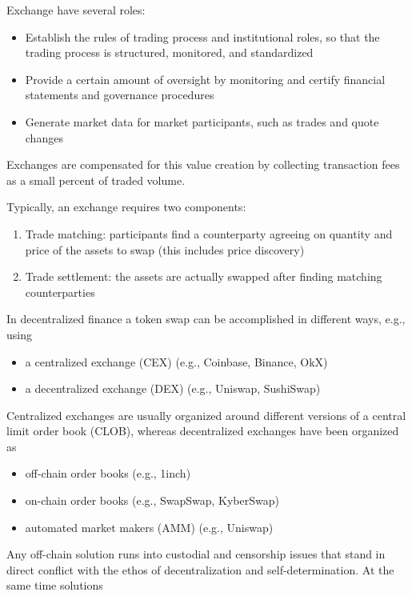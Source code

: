 \documentclass[11pt, reqno]{amsart}
\theoremstyle{definition}
\theoremstyle{remark}
\begin{document}
Exchange have several roles:
\begin{itemize}
\item Establish the rules of trading process and institutional roles, so that
  the trading process is structured, monitored, and standardized
\item Provide a certain amount of oversight by monitoring and certify financial
  statements and governance procedures
\item Generate market data for market participants, such 
     as trades and quote changes
\end{itemize}

Exchanges are compensated for this value creation by collecting transaction
fees as a small percent of traded volume.

Typically, an exchange requires two components:
\begin{enumerate}
	\item Trade matching: participants find a counterparty agreeing on quantity
          and price of the assets to swap (this includes price discovery)
	\item Trade settlement: the assets are actually swapped after finding
	      matching counterparties
\end{enumerate}

In decentralized finance a token swap can be accomplished in different ways,
e.g., using
\begin{itemize}
    \item a centralized exchange (CEX) (e.g., Coinbase, Binance, OkX)
    \item a decentralized exchange (DEX) (e.g., Uniswap, SushiSwap)
\end{itemize}

Centralized exchanges are usually organized around different versions of a
central limit order book (CLOB), whereas
decentralized exchanges have been organized as
\begin{itemize}
	\item off-chain order books (e.g., 1inch)
	\item on-chain order books (e.g., SwapSwap, KyberSwap)
	\item automated market makers (AMM) (e.g., Uniswap)
\end{itemize}

Any off-chain solution runs into custodial and censorship issues that stand
in direct conflict with the ethos of decentralization and self-determination.
At the same time solutions 
\end{document}
